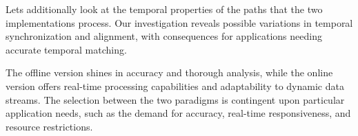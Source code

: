 Lets additionally look at the temporal properties of the paths that the two implementations process. Our investigation reveals possible variations in temporal synchronization and alignment, with consequences for applications needing accurate temporal matching.

The offline version shines in accuracy and thorough analysis, while the online version offers real-time processing capabilities and adaptability to dynamic data streams. The selection between the two paradigms is contingent upon particular application needs, such as the demand for accuracy, real-time responsiveness, and resource restrictions.




